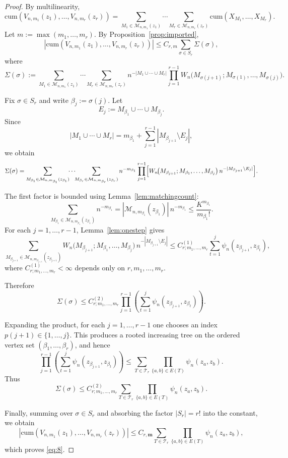 \documentclass[11pt]{article}
\newcommand{\abs}[1]{| #1|}
\begin{document}
\begin{proof}
By multilinearity,
\[
\mathrm{cum}\!\left(V_{n,m_1}(z_1),\dots,V_{n,m_r}(z_r)\right)
=
\sum_{M_1\in\mathcal M_{n,m_1}(z_1)}
\cdots
\sum_{M_r\in\mathcal M_{n,m_r}(z_r)}
\mathrm{cum}(X_{M_1},\dots,X_{M_r}).
\]
Let $m:=\max(m_1,\dots,m_r)$. By Proposition~\ref{prop:imported},
\[ 
\left|
\mathrm{cum}\!\left(V_{n,m_1}(z_1),\dots,V_{n,m_r}(z_r)\right)
\right|
\le
C_{r,m}\sum_{\sigma\in S_r}\Sigma(\sigma),
\]
where
\[
\Sigma(\sigma):=
\sum_{M_1\in\mathcal M_{n,m_1}(z_1)}
\cdots
\sum_{M_r\in\mathcal M_{n,m_r}(z_r)}
n^{-\abs{M_1\cup\cdots\cup M_r}}
\prod_{j=1}^{r-1}
W_n\!\bigl(M_{\sigma(j+1)};M_{\sigma(1)},\dots,M_{\sigma(j)}\bigr).
\]

Fix $\sigma\in S_r$ and write $\beta_j:=\sigma(j)$. Let
\[
E_j:=M_{\beta_1}\cup\cdots\cup M_{\beta_j}.
\]
Since
\[
\abs{M_1\cup\cdots\cup M_r}
=
m_{\beta_1}
+
\sum_{j=1}^{r-1}\abs{M_{\beta_{j+1}}\setminus E_j},
\]
we obtain
\[
\Sigma(\sigma)
=
\sum_{M_{\beta_1}\in\mathcal M_{n,m_{\beta_1}}(z_{\beta_1})}\!\!
\cdots\!\!
\sum_{M_{\beta_r}\in\mathcal M_{n,m_{\beta_r}}(z_{\beta_r})}
n^{-m_{\beta_1}}
\prod_{j=1}^{r-1}
\Bigl[
W_n\!\bigl(M_{\beta_{j+1}};M_{\beta_1},\dots,M_{\beta_j}\bigr)
\,n^{-\abs{M_{\beta_{j+1}}\setminus E_j}}
\Bigr].
\]

The first factor is bounded using Lemma~\ref{lem:matchingcount}:
\[
\sum_{M_{\beta_1}\in\mathcal M_{n,m_{\beta_1}}(z_{\beta_1})}
n^{-m_{\beta_1}}
=
|\mathcal M_{n,m_{\beta_1}}(z_{\beta_1})|\,n^{-m_{\beta_1}}
\le
\frac{K^{m_{\beta_1}}}{m_{\beta_1}!}.
\]
For each $j=1,\dots,r-1$, Lemma~\ref{lem:onestep} gives
\[
\sum_{M_{\beta_{j+1}}\in\mathcal M_{n,m_{\beta_{j+1}}}(z_{\beta_{j+1}})}
W_n\!\bigl(M_{\beta_{j+1}};M_{\beta_1},\dots,M_{\beta_j}\bigr)
\,n^{-\abs{M_{\beta_{j+1}}\setminus E_j}}
\le
C_{r;m_1,\dots,m_r}^{(1)}
\sum_{t=1}^{j}\psi_n(z_{\beta_{j+1}},z_{\beta_t}),
\]
where $C_{r;m_1,\dots,m_r}^{(1)}<\infty$ depends only on $r,m_1,\dots,m_r$.

Therefore
\[
\Sigma(\sigma)
\le
C_{r;m_1,\dots,m_r}^{(2)}
\prod_{j=1}^{r-1}
\left(
\sum_{t=1}^{j}\psi_n(z_{\beta_{j+1}},z_{\beta_t})
\right).
\]

Expanding the product, for each $j=1,\dots,r-1$ one chooses an index
$p(j+1)\in\{1,\dots,j\}$. This produces a rooted increasing tree on the ordered vertex set
$(\beta_1,\dots,\beta_r)$, and hence
\[
\prod_{j=1}^{r-1}
\left(
\sum_{t=1}^{j}\psi_n(z_{\beta_{j+1}},z_{\beta_t})
\right)
\le
\sum_{T\in\mathcal T_r}
\prod_{\{a,b\}\in E(T)}\psi_n(z_a,z_b).
\]
Thus
\[
\Sigma(\sigma)
\le
C_{r;m_1,\dots,m_r}^{(2)}
\sum_{T\in\mathcal T_r}
\prod_{\{a,b\}\in E(T)}\psi_n(z_a,z_b).
\]

Finally, summing over $\sigma\in S_r$ and absorbing the factor $|S_r|=r!$ into the constant,
we obtain
\[
\left|
\mathrm{cum}\!\left(V_{n,m_1}(z_1),\dots,V_{n,m_r}(z_r)\right)
\right|
\le
C_{r, \mathbf{m}}
\sum_{T\in\mathcal T_r}
\prod_{\{a,b\}\in E(T)}\psi_n(z_a,z_b),
\]
which proves \eqref{eq:8}.
\end{proof}
\end{document}

